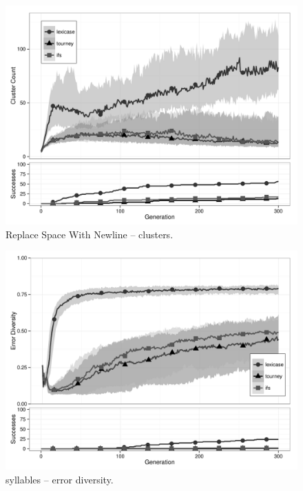 \begin{figure}[p] %
\centering
\includegraphics[width=11.5cm]{replace-space-with-newline-cluster.pdf}
\caption{Replace Space With Newline -- clusters.}
\label{rswnClu}
\end{figure}

\begin{figure}[p] %
\centering
\includegraphics[width=11.5cm]{syllables-diversity.pdf}
\caption{syllables -- error diversity.}
\label{syllablesDiv}
\end{figure}

